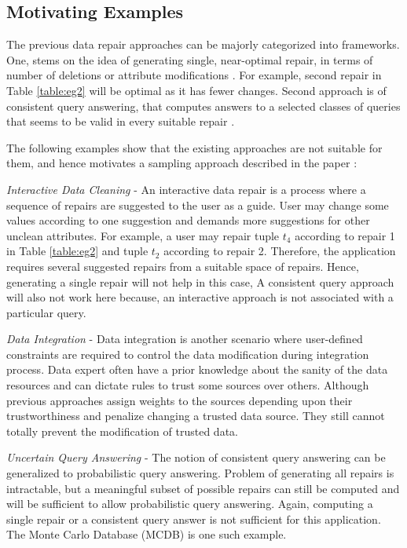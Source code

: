 \subsection{Motivating Examples}
The previous data repair approaches can be majorly categorized into frameworks.
One, stems on the idea of generating single, near-optimal repair, in terms of number of deletions or attribute modifications \cite{Kolahi} \cite{Bohannon}.
For example, second repair in Table \ref{table:eg2} will be optimal as it has fewer changes.
Second approach is of consistent query answering, that computes answers to a selected classes of queries that seems to be valid in every suitable repair \cite{Arenas,Chomicki,Fuxman,Wijsen}.

The following examples show that the existing approaches are not suitable for them, and hence motivates a sampling approach described in the paper \cite{Beskales_sampling}:

\medskip

\textit{Interactive Data Cleaning} - An interactive data repair is a process where a sequence of repairs are suggested to the user as a guide.
User may change some values according to one suggestion and demands more suggestions for other unclean attributes.
For example, a user may repair tuple $t_4$ according to repair 1 in Table \ref{table:eg2} and tuple $t_2$ according to repair 2.
Therefore, the application requires several suggested repairs from a suitable space of repairs.
Hence, generating a single repair will not help in this case, 
A consistent query approach will also not work here because, an interactive approach is not associated with a particular query.

\medskip

\textit{Data Integration} - Data integration is another scenario where user-defined constraints are required to control the data modification during integration process.
Data expert often have a prior knowledge about the sanity of the data resources and can dictate rules to trust some sources over others.
Although previous approaches \cite{Bohannon,Kolahi} assign weights to the sources depending upon their trustworthiness and penalize changing a trusted data source.
They still cannot totally prevent the modification of trusted data.

\medskip

\textit{Uncertain Query Answering} - The notion of consistent query answering can be generalized to probabilistic query answering.
Problem of generating all repairs is intractable, but a meaningful subset of possible repairs can still be computed and will be sufficient to allow probabilistic query answering.
Again, computing a single repair or a consistent query answer is not sufficient for this application.
The Monte Carlo Database (MCDB) \cite{Jampani} is one such example.

